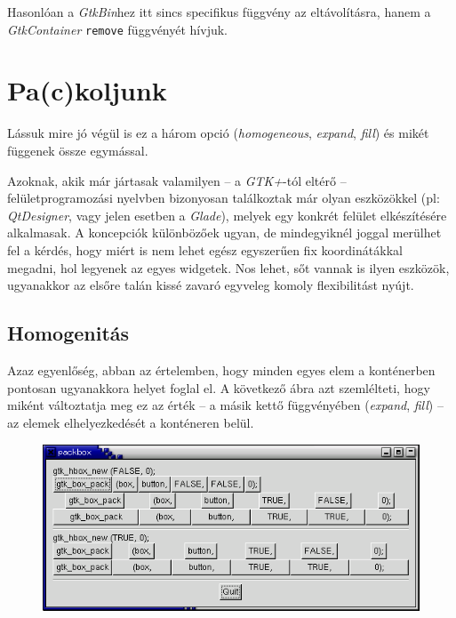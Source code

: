 \documentclass[a4paper,10pt]{article}
\begin{document}
Hasonlóan a \textit{GtkBin}hez itt sincs specifikus függvény az eltávolításra, hanem a \textit{GtkContainer} \texttt{remove} függvényét hívjuk.

\section{Pa(c)koljunk}

Lássuk mire jó végül is ez a három opció (\textit{homogeneous}, \textit{expand}, \textit{fill}) és mikét függenek össze egymással.

Azoknak, akik már jártasak valamilyen -- a \textit{GTK+}-tól eltérő -- felületprogramozási nyelvben bizonyosan találkoztak már olyan eszközökkel (pl: \textit{QtDesigner}, vagy jelen esetben a \textit{Glade}), melyek egy konkrét felület elkészítésére alkalmasak. A koncepciók különbözőek ugyan, de mindegyiknél joggal merülhet fel a kérdés, hogy miért is nem lehet egész egyszerűen fix koordinátákkal megadni, hol legyenek az egyes widgetek. Nos lehet, sőt vannak is ilyen eszközök, ugyanakkor az elsőre talán kissé zavaró egyveleg komoly flexibilitást nyújt.

\subsection{Homogenitás}

Azaz egyenlőség, abban az értelemben, hogy minden egyes elem a konténerben pontosan ugyanakkora helyet foglal el. A következő ábra azt szemlélteti, hogy miként változtatja meg ez az érték -- a másik kettő függvényében (\textit{expand}, \textit{fill}) -- az elemek elhelyezkedését a konténeren belül.

\vspace{12 pt}
\begin{figure}[H]
\begin{center}
\includegraphics[height=50mm]{images/packbox1.png}
\end{center}
\end{figure}
\end{document}
